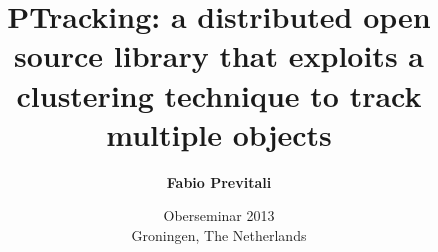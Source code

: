 \documentclass{beamer}
\title[PTracking open source library]{\Large PTracking: a distributed open source library that exploits a clustering technique to track multiple objects}
\subtitle{}
\author[Fabio Previtali]{\Large\textbf{Fabio Previtali}}
\date[May 13, 2013]{Oberseminar 2013\\Groningen, The Netherlands}
\begin{document}
\begin{frame}[plain]
	\titlepage
\end{frame}







\tiny


\nocite{Hampapur05}
\nocite{Pless00}
\nocite{Haritaoglu00}
\nocite{Stauffer00}
\end{document}
